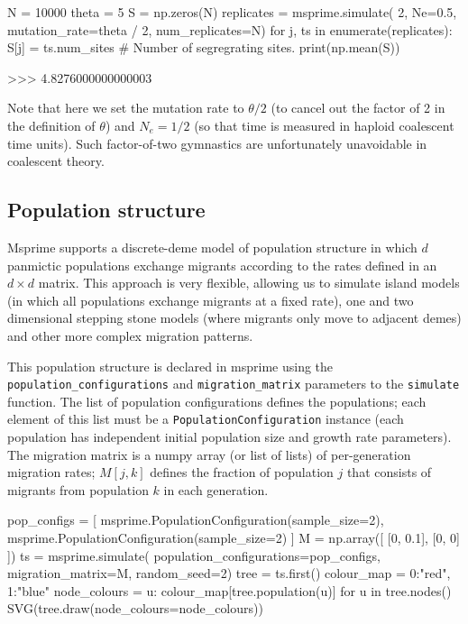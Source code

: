\documentclass[graybox]{svmult}
\begin{document}
\begin{pythoncode}
N = 10000
theta = 5
S = np.zeros(N)
replicates = msprime.simulate(
    2, Ne=0.5, mutation_rate=theta / 2, num_replicates=N)
for j, ts in enumerate(replicates):
    S[j] = ts.num_sites  # Number of segregrating sites.
print(np.mean(S))

>>> 4.8276000000000003
\end{pythoncode}

    Note that here we set the mutation rate to \(\theta / 2\) (to cancel out
the factor of 2 in the definition of \(\theta\)) and \(N_e = 1/2\) (so
that time is measured in haploid coalescent time units). Such
factor-of-two gymnastics are unfortunately unavoidable in coalescent
theory.

\subsection{Population structure}\label{population-structure}

Msprime supports a discrete-deme model of population structure in which
\(d\) panmictic populations exchange migrants according to the rates
defined in an \(d \times d\) matrix. This approach is very flexible,
allowing us to simulate island models (in which all populations exchange
migrants at a fixed rate), one and two dimensional stepping stone models
(where migrants only move to adjacent demes) and other more complex
migration patterns.

This population structure is declared in msprime using the
\texttt{population\_configurations} and \texttt{migration\_matrix}
parameters to the \texttt{simulate} function. The list of population
configurations defines the populations; each element of this list must
be a \texttt{PopulationConfiguration} instance (each population has
independent initial population size and growth rate parameters). The
migration matrix is a numpy array (or list of lists) of per-generation
migration rates; \(M[j,k]\) defines the fraction of population \(j\)
that consists of migrants from population \(k\) in each generation.

\begin{pythoncode}
pop_configs = [
    msprime.PopulationConfiguration(sample_size=2),
    msprime.PopulationConfiguration(sample_size=2)
]
M = np.array([
    [0, 0.1],
    [0, 0]
])
ts  = msprime.simulate(
    population_configurations=pop_configs, migration_matrix=M,
    random_seed=2)
tree = ts.first()
colour_map = {0:"red", 1:"blue"}
node_colours = {
    u: colour_map[tree.population(u)] for u in tree.nodes()}
SVG(tree.draw(node_colours=node_colours))
\end{pythoncode}
\end{document}
